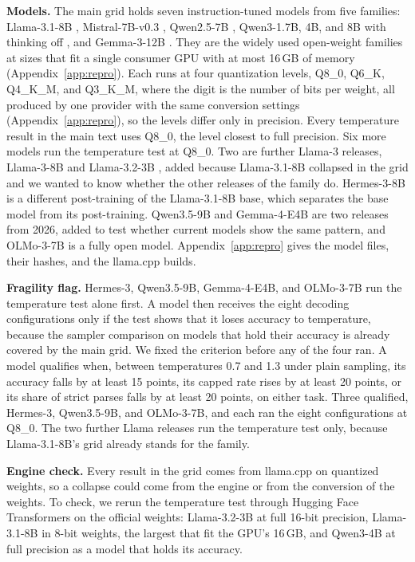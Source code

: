 \documentclass[11pt]{article}
\begin{document}
\textbf{Models.} The main grid holds seven instruction-tuned models from five families:
Llama-3.1-8B \citep{grattafiori2024llama}, Mistral-7B-v0.3 \citep{jiang2023mistral}, Qwen2.5-7B
\citep{yang2024qwen25}, Qwen3-1.7B, 4B, and 8B with thinking off \citep{yang2025qwen3}, and
Gemma-3-12B \citep{gemma2025gemma3}. They are the widely used open-weight families at sizes that
fit a single consumer GPU with at most 16\,GB of memory (Appendix~\ref{app:repro}). Each
runs at four quantization levels, Q8\_0, Q6\_K, Q4\_K\_M, and Q3\_K\_M, where the digit is the
number of bits per weight, all produced by one provider with the same conversion settings
(Appendix~\ref{app:repro}), so the levels differ only in precision. Every temperature result in
the main text uses Q8\_0, the level closest to full precision. Six more models run the temperature
test at Q8\_0. Two are further Llama-3 releases, Llama-3-8B \citep{meta2024llama3} and
Llama-3.2-3B \citep{meta2024llama32}, added because Llama-3.1-8B collapsed in the grid and we
wanted to know whether the other releases of the family do. Hermes-3-8B \citep{teknium2024hermes3}
is a different post-training of the Llama-3.1-8B base, which separates the base model from its
post-training. Qwen3.5-9B \citep{qwen2026qwen35} and Gemma-4-E4B \citep{google2026gemma4} are
two releases from 2026, added to test whether current models show the same pattern, and
OLMo-3-7B \citep{ai2025olmo3} is a fully open model. Appendix~\ref{app:repro} gives the model
files, their hashes, and the llama.cpp builds.

\textbf{Fragility flag.} Hermes-3, Qwen3.5-9B, Gemma-4-E4B, and OLMo-3-7B run the temperature
test alone first. A model then receives the eight decoding configurations only if the test shows
that it loses accuracy to temperature, because the sampler comparison on models that hold their
accuracy is already covered by the main grid. We fixed the criterion before any of the four ran.
A model qualifies when, between temperatures 0.7 and 1.3 under plain sampling, its accuracy
falls by at least 15 points, its capped rate rises by at least 20 points, or its share of strict
parses falls by at least 20 points, on either task. Three qualified, Hermes-3, Qwen3.5-9B, and
OLMo-3-7B, and each ran the eight configurations at Q8\_0. The two further Llama releases run
the temperature test only, because Llama-3.1-8B's grid already stands for the family.

\textbf{Engine check.} Every result in the grid comes from llama.cpp on quantized weights, so a
collapse could come from the engine or from the conversion of the weights. To check, we rerun
the temperature test through Hugging Face Transformers \citep{wolf2020transformers} on the
official weights: Llama-3.2-3B at full 16-bit precision, Llama-3.1-8B in 8-bit weights, the
largest that fit the GPU's 16\,GB, and Qwen3-4B at full precision as a model that holds its accuracy.
\end{document}
